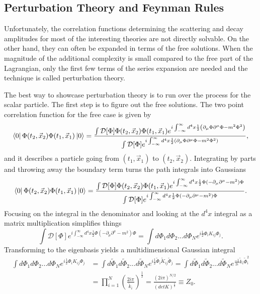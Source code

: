 \subsection{Perturbation Theory and Feynman Rules}
Unfortunately, the correlation functions determining the scattering and decay amplitudes for most of the interesting theories are not directly solvable. On the other hand, they can often be expanded in terms of the free solutions. When the magnitude of the additional complexity is small compared to the free part of the Lagrangian, only the first few terms of the series expansion are needed and the technique is called perturbation theory. 

The best way to showcase perturbation theory is to run over the process for the scalar particle. The first step is to figure out the free solutions. The two point correlation function for the free case is given by
\begin{equation}
\bra{0}\Phi(t_2,\vec{x}_2)\Phi(t_1,\vec{x}_1)\ket{0} = 
\frac{\int \mathcal{D}[\Phi]\Phi(t_2,\vec{x}_2)\Phi(t_1,\vec{x}_1)e^{i\int_{-\infty}^{\infty} d^4x \frac{1}{2}\left(\partial_\mu\Phi\partial^\mu\Phi - m^2 \Phi^2 \right)}}
{\int \mathcal{D}[\Phi]e^{i\int_{-\infty}^{\infty} d^4x \frac{1}{2}\left(\partial_\mu\Phi\partial^\mu\Phi - m^2 \Phi^2 \right)}},
\end{equation}
and it describes a particle going from $(t_1,\vec{x}_1)$ to $(t_2,\vec{x}_2)$. Integrating by parts and throwing away the boundary term turns the path integrals into Gaussians 
\begin{equation}
\bra{0}\Phi(t_2,\vec{x}_2)\Phi(t_1,\vec{x}_1)\ket{0} = 
\frac{\int \mathcal{D}[\Phi]\Phi(t_2,\vec{x}_2)\Phi(t_1,\vec{x}_1)e^{i\int_{-\infty}^{\infty} d^4x \frac{1}{2}\Phi (-\partial_\mu\partial^\mu - m^2)\Phi}}
{\int \mathcal{D}[\Phi]e^{i\int_{-\infty}^{\infty} d^4x \frac{1}{2}\Phi (-\partial_\mu\partial^\mu - m^2)\Phi}}.
\end{equation}
Focusing on the integral in the denominator and looking at the $d^4x$ integral as a matrix multiplication simplifies things 
\begin{equation}
\int \mathcal{D}[\Phi]e^{i\int_{-\infty}^{\infty} d^4x \frac{1}{2}\Phi (-\partial_\mu\partial^\mu - m^2)\Phi}
= \int d\Phi_1 d\Phi_2 ... d\Phi_N e^{i\frac{1}{2}\Phi_{i} K_{ij} \Phi_{j}}.
\end{equation}
Transforming to the eigenbasis yields a multidimensional Gaussian integral
\begin{equation}
\begin{split}
 \int d\Phi_1 d\Phi_2 ... d\Phi_N e^{i\frac{1}{2}\Phi_{i} K_{ij} \Phi_{j}} 
 &= \int d\tilde{\Phi}_1 d\tilde{\Phi}_2 ... d\tilde{\Phi}_N e^{i\frac{1}{2}\tilde{\Phi}_{i} \tilde{K}_{ij} \tilde{\Phi}_{j}} 
 = \int d\tilde{\Phi}_1 d\tilde{\Phi}_2 ... d\tilde{\Phi}_N e^{\frac{-1}{2i} \tilde{k}_i \tilde{\Phi}_{i}^2} \\ 
& = \prod_{i=1}^N \left( \frac{2i\pi}{\tilde{k}_i} \right)^\frac{1}{2} = \frac{\left( 2i\pi \right)^{N/2}}{ \left( detK \right)^\frac{1}{2}} \equiv Z_0.
\end{split}
\end{equation}

